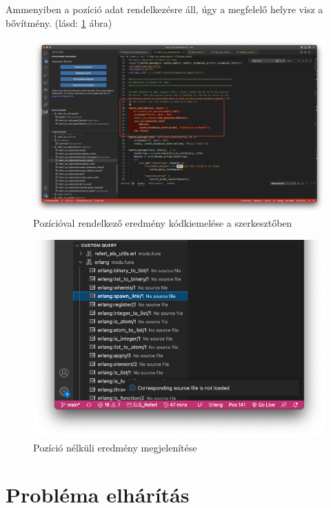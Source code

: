 Ammenyiben a pozíció adat rendelkezésre áll, úgy a megfelelő helyre visz a bővítmény. (lásd: \ref{fig:code_highligh} ábra)

\begin{figure}[H]
  \centering
  \includegraphics[width=\linewidth]{images/code_highlight.png}
  \caption{Pozícióval rendelkező eredmény kódkiemelése a szerkesztőben}
  \label{fig:code_highligh}
\end{figure}

\begin{figure}[H]
  \centering
  \includegraphics[width=\linewidth]{images/nopos.png}
  \caption{Pozíció nélküli eredmény megjelenítése}
  \label{fig:nopos_res}
\end{figure}



\section{Probléma elhárítás}
